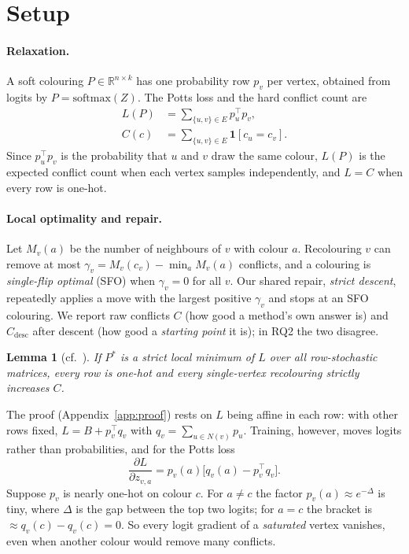 \documentclass[11pt]{article}
\newtheorem{lemma}{Lemma}
\newcommand{\Cd}{C_{\mathrm{desc}}}
\begin{document}
\section{Setup}
\label{sec:method}

\paragraph{Relaxation.} A soft colouring $P\in\mathbb{R}^{n\times k}$ has one
probability row $p_v$ per vertex, obtained from logits by
$P=\mathrm{softmax}(Z)$. The Potts loss and the hard conflict count are
\begin{align*}
L(P)&=\textstyle\sum_{\{u,v\}\in E}p_u^{\top}p_v,\\
C(c)&=\textstyle\sum_{\{u,v\}\in E}\mathbf{1}[c_u=c_v].
\end{align*}
Since $p_u^\top p_v$ is the probability that $u$ and $v$ draw the same colour,
$L(P)$ is the expected conflict count when each vertex samples independently,
and $L=C$ when every row is one-hot.

\paragraph{Local optimality and repair.} Let $M_v(a)$ be the number of
neighbours of $v$ with colour $a$. Recolouring $v$ can remove at most
$\gamma_v=M_v(c_v)-\min_a M_v(a)$ conflicts, and a colouring is
\emph{single-flip optimal} (SFO) when $\gamma_v=0$ for all $v$. Our shared
repair, \emph{strict descent}, repeatedly applies a move with the largest
positive $\gamma_v$ and stops at an SFO colouring. We report raw conflicts $C$
(how good a method's own answer is) and $\Cd$ after descent (how good a
\emph{starting point} it is); in RQ2 the two disagree.

\begin{lemma}[cf.\ \citealp{rosenberg1972}]\label{lem:strict}
If $P^*$ is a strict local minimum of $L$ over all row-stochastic matrices,
every row is one-hot and every single-vertex recolouring strictly increases $C$.
\end{lemma}

\noindent The proof (Appendix~\ref{app:proof}) rests on $L$ being affine in
each row: with other rows fixed, $L=B+p_v^\top q_v$ with
$q_v=\sum_{u\in N(v)}p_u$. Training, however, moves logits rather than
probabilities, and for the Potts loss
\begin{equation}
\frac{\partial L}{\partial z_{v,a}}=p_v(a)\bigl[q_v(a)-p_v^\top q_v\bigr].
\label{eq:grad}
\end{equation}
Suppose $p_v$ is nearly one-hot on colour $c$. For $a\neq c$ the factor
$p_v(a)\approx e^{-\Delta}$ is tiny, where $\Delta$ is the gap between the top
two logits; for $a=c$ the bracket is $\approx q_v(c)-q_v(c)=0$. So every logit
gradient of a \emph{saturated} vertex vanishes, even when another colour would
remove many conflicts.
\end{document}
